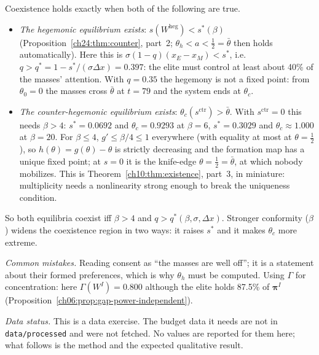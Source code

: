 \documentclass[../solutions_manual.tex]{subfiles}
\begin{document}
Coexistence holds exactly when both of the following are true.
\begin{itemize}
\item \emph{The hegemonic equilibrium exists}: $s(W^{\text{heg}}) < s^*(\beta)$ (Proposition~\ref{ch24:thm:counter}, part~2; $\theta_h < a < \tfrac12 = \bar\theta$ then holds automatically). Here this is $\sigma(1-q)(x_E - x_M) < s^*$, i.e.\ $q > q^* = 1 - s^*/(\sigma\Delta x) = 0.397$: the elite must control at least about 40\% of the masses' attention. With $q = 0.35$ the hegemony is not a fixed point: from $\theta_0 = 0$ the masses cross $\bar\theta$ at $t = 79$ and the system ends at $\theta_c$.
\item \emph{The counter-hegemonic equilibrium exists}: $\theta_c(s^{\text{ctr}}) > \bar\theta$. With $s^{\text{ctr}} = 0$ this needs $\beta > 4$: $s^* = 0.0692$ and $\theta_c = 0.9293$ at $\beta = 6$, $s^* = 0.3029$ and $\theta_c \approx 1.000$ at $\beta = 20$. For $\beta \le 4$, $g' \le \beta/4 \le 1$ everywhere (with equality at most at $\theta = \tfrac12$), so $h(\theta) = g(\theta) - \theta$ is strictly decreasing and the formation map has a unique fixed point; at $s = 0$ it is the knife-edge $\theta = \tfrac12 = \bar\theta$, at which nobody mobilizes. This is Theorem~\ref{ch10:thm:existence}, part~3, in miniature: multiplicity needs a nonlinearity strong enough to break the uniqueness condition.
\end{itemize}
So both equilibria coexist iff $\beta > 4$ and $q > q^*(\beta, \sigma, \Delta x)$. Stronger conformity ($\beta$) widens the coexistence region in two ways: it raises $s^*$ and it makes $\theta_c$ more extreme.

\emph{Common mistakes.} Reading consent as ``the masses are well off''; it is a statement about their formed preferences, which is why $\theta_h$ must be computed. Using $\Gamma$ for concentration: here $\Gamma(W^I) = 0.800$ although the elite holds 87.5\% of $\boldsymbol{\pi}^I$ (Proposition~\ref{ch06:prop:gap-power-independent}).


\emph{Data status.} This is a data exercise. The budget data it needs are not in \texttt{data/processed} and were not fetched. No values are reported for them here; what follows is the method and the expected qualitative result.
\end{document}
